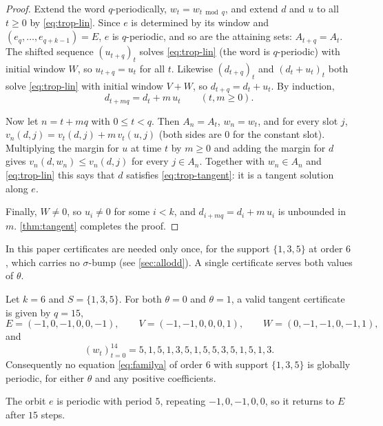 \begin{proof}
Extend the word $q$-periodically, $w_t=w_{t\bmod q}$, and extend $d$ and $u$ to all
$t\ge0$ by \eqref{eq:trop-lin}. Since $e$ is determined by its window and
$(e_q,\dots,e_{q+k-1})=E$, $e$ is $q$-periodic, and so are the attaining sets:
$A_{t+q}=A_t$. The shifted sequence $(u_{t+q})_t$ solves \eqref{eq:trop-lin} (the word
is $q$-periodic) with initial window $W$, so $u_{t+q}=u_t$ for all $t$. Likewise
$(d_{t+q})_t$ and $(d_t+u_t)_t$ both solve \eqref{eq:trop-lin} with initial window
$V+W$, so $d_{t+q}=d_t+u_t$. By induction,
\[
d_{t+mq}=d_t+m\,u_t\qquad(t,m\ge0).
\]

Now let $n=t+mq$ with $0\le t<q$. Then $A_n=A_t$, $w_n=w_t$, and for every slot $j$,
$v_n(d,j)=v_t(d,j)+m\,v_t(u,j)$ (both sides are $0$ for the constant slot).
Multiplying the margin for $u$ at time $t$ by $m\ge0$ and adding the margin for $d$
gives $v_n(d,w_n)\le v_n(d,j)$ for every $j\in A_n$. Together with $w_n\in A_n$ and
\eqref{eq:trop-lin} this says that $d$ satisfies \eqref{eq:trop-tangent}: it is a
tangent solution along $e$.

Finally, $W\ne0$, so $u_i\ne0$ for some $i<k$, and $d_{i+mq}=d_i+m\,u_i$ is
unbounded in $m$. \autoref{thm:tangent} completes the proof.
\end{proof}

In this paper certificates are needed only once, for the support $\{1,3,5\}$ at
order $6$, which carries no $\sigma$-bump (see \autoref{sec:allodd}). A single
certificate serves both values of $\theta$.

\begin{proposition}
\label{prop:order6cert}
Let $k=6$ and $S=\{1,3,5\}$. For both $\theta=0$ and $\theta=1$, a valid tangent
certificate is given by $q=15$,
\[
E=(-1,0,-1,0,0,-1),\qquad V=(-1,-1,0,0,0,1),\qquad W=(0,-1,-1,0,-1,1),
\]
and
\[
(w_t)_{t=0}^{14}=5,1,5,1,3,5,1,5,5,3,5,1,5,1,3.
\]
Consequently no equation \eqref{eq:familya} of order $6$ with support $\{1,3,5\}$ is
globally periodic, for either $\theta$ and any positive coefficients.
\end{proposition}

The orbit $e$ is periodic with period $5$, repeating $-1,0,-1,0,0$, so it
returns to $E$ after $15$ steps.

